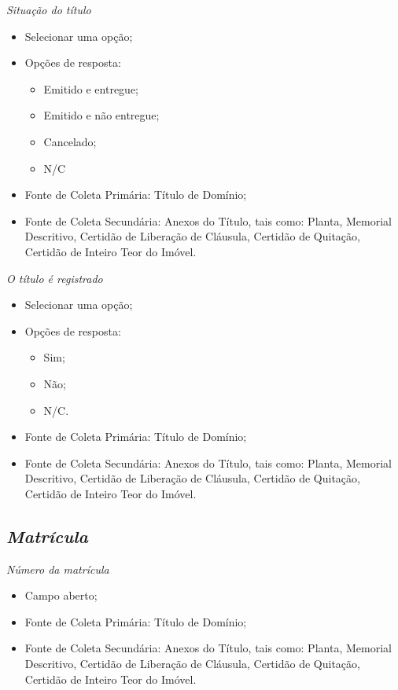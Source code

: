 \documentclass[
  letterpaper,
]{report}
\providecommand{\tightlist}{%
  \setlength{\itemsep}{0pt}\setlength{\parskip}{0pt}}\usepackage{longtable,booktabs,array}
\begin{document}
\emph{Situação do título}

\begin{itemize}
\tightlist
\item
  Selecionar uma opção;
\item
  Opções de resposta:

  \begin{itemize}
  \tightlist
  \item
    Emitido e entregue;
  \item
    Emitido e não entregue;
  \item
    Cancelado;
  \item
    N/C
  \end{itemize}
\item
  Fonte de Coleta Primária: Título de Domínio;
\item
  Fonte de Coleta Secundária: Anexos do Título, tais como: Planta,
  Memorial Descritivo, Certidão de Liberação de Cláusula, Certidão de
  Quitação, Certidão de Inteiro Teor do Imóvel.
\end{itemize}

\emph{O título é registrado}

\begin{itemize}
\tightlist
\item
  Selecionar uma opção;
\item
  Opções de resposta:

  \begin{itemize}
  \tightlist
  \item
    Sim;
  \item
    Não;
  \item
    N/C.
  \end{itemize}
\item
  Fonte de Coleta Primária: Título de Domínio;
\item
  Fonte de Coleta Secundária: Anexos do Título, tais como: Planta,
  Memorial Descritivo, Certidão de Liberação de Cláusula, Certidão de
  Quitação, Certidão de Inteiro Teor do Imóvel.
\end{itemize}

\hypertarget{matruxedcula-1}{%
\subsection{\texorpdfstring{\emph{Matrícula}}{Matrícula}}\label{matruxedcula-1}}

\emph{Número da matrícula}

\begin{itemize}
\tightlist
\item
  Campo aberto;
\item
  Fonte de Coleta Primária: Título de Domínio;
\item
  Fonte de Coleta Secundária: Anexos do Título, tais como: Planta,
  Memorial Descritivo, Certidão de Liberação de Cláusula, Certidão de
  Quitação, Certidão de Inteiro Teor do Imóvel.
\end{itemize}
\end{document}

